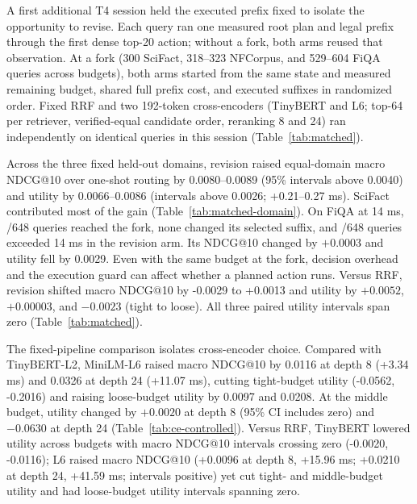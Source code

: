 A first additional T4 session held the executed prefix fixed to isolate the opportunity to revise. Each query ran one measured root plan and legal prefix through the first dense top-20 action; without a fork, both arms reused that observation. At a fork (300 SciFact, 318--323 NFCorpus, and 529--604 FiQA queries across budgets), both arms started from the same state and measured remaining budget, shared full prefix cost, and executed suffixes in randomized order. Fixed RRF and two 192-token cross-encoders (TinyBERT and L6; top-64 per retriever, verified-equal candidate order, reranking 8 and 24) ran independently on identical queries in this session (Table~\ref{tab:matched}).

Across the three fixed held-out domains, revision raised equal-domain macro NDCG@10 over one-shot routing by 0.0080--0.0089 (95\% intervals above 0.0040) and utility by 0.0066--0.0086 (intervals above 0.0026; +0.21--0.27 ms). SciFact contributed most of the gain (Table~\ref{tab:matched-domain}). On FiQA at 14 ms, \TightForks{}/648 queries reached the fork, none changed its selected suffix, and \TightMatchedOver{}/648 queries exceeded 14 ms in the revision arm. Its NDCG@10 changed by $+0.0003$ and utility fell by 0.0029. Even with the same budget at the fork, decision overhead and the execution guard can affect whether a planned action runs. Versus RRF, revision shifted macro NDCG@10 by -0.0029 to +0.0013 and utility by $+0.0052$, $+0.00003$, and $-0.0023$ (tight to loose). All three paired utility intervals span zero (Table~\ref{tab:matched}).

The fixed-pipeline comparison isolates cross-encoder choice. Compared with TinyBERT-L2, MiniLM-L6 raised macro NDCG@10 by 0.0116 at depth 8 (+3.34 ms) and 0.0326 at depth 24 (+11.07 ms), cutting tight-budget utility (-0.0562, -0.2016) and raising loose-budget utility by 0.0097 and 0.0208. At the middle budget, utility changed by $+0.0020$ at depth 8 (95\% CI includes zero) and $-0.0630$ at depth 24 (Table~\ref{tab:ce-controlled}). Versus RRF, TinyBERT lowered utility across budgets with macro NDCG@10 intervals crossing zero (-0.0020, -0.0116); L6 raised macro NDCG@10 (+0.0096 at depth 8, +15.96 ms; +0.0210 at depth 24, +41.59 ms; intervals positive) yet cut tight- and middle-budget utility and had loose-budget utility intervals spanning zero.
